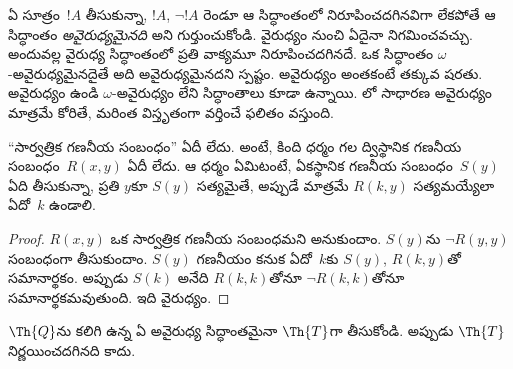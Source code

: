\documentclass[../../../include/open-logic-section]{subfiles}
\begin{document}


\begin{explain}
ఏ సూత్రం~$!A$ తీసుకున్నా, $!A$, $\lnot !A$ రెండూ ఆ సిద్ధాంతంలో
నిరూపించదగినవిగా లేకపోతే ఆ సిద్ధాంతం \emph{అవైరుధ్యమైనది} అని గుర్తుంచుకోండి.
వైరుధ్యం నుంచి ఏదైనా నిగమించవచ్చు. అందువల్ల వైరుధ్య సిద్ధాంతంలో ప్రతి వాక్యమూ
నిరూపించదగినదే. ఒక సిద్ధాంతం
$\omega$-అవైరుధ్యమైనదైతే అది అవైరుధ్యమైనదని స్పష్టం. అవైరుధ్యం అంతకంటే తక్కువ షరతు. అవైరుధ్యం ఉండి
$\omega$-అవైరుధ్యం లేని సిద్ధాంతాలు కూడా ఉన్నాయి. లో
సాధారణ అవైరుధ్యం మాత్రమే కోరితే, మరింత విస్తృతంగా వర్తించే ఫలితం వస్తుంది.
\end{explain}

\begin{lem}
``సార్వత్రిక గణనీయ సంబంధం'' ఏదీ లేదు. అంటే, కింది ధర్మం గల ద్విస్థానిక గణనీయ
సంబంధం~$R(x,y)$ ఏదీ లేదు. ఆ ధర్మం ఏమిటంటే, ఏకస్థానిక గణనీయ
సంబంధం~$S(y)$ ఏది తీసుకున్నా, ప్రతి $y$కూ $S(y)$ సత్యమైతే, అప్పుడే మాత్రమే $R(k,y)$
సత్యమయ్యేలా ఏదో~$k$ ఉండాలి.
\end{lem}

\begin{proof}
$R(x,y)$ ఒక సార్వత్రిక గణనీయ సంబంధమని అనుకుందాం. $S(y)$ను $\lnot R(y,y)$
సంబంధంగా తీసుకుందాం. $S(y)$ గణనీయం కనుక ఏదో~$k$కు $S(y)$,
$R(k,y)$తో సమానార్థకం. అప్పుడు $S(k)$ అనేది $R(k,k)$తోనూ
$\lnot R(k,k)$తోనూ సమానార్థకమవుతుంది. ఇది వైరుధ్యం.
\end{proof}


\begin{thm}
$\Th{Q}$ను కలిగి ఉన్న ఏ అవైరుధ్య సిద్ధాంతమైనా $\Th{T}$గా తీసుకోండి. అప్పుడు
$\Th{T}$ నిర్ణయించదగినది కాదు.
\end{thm}
\end{document}
